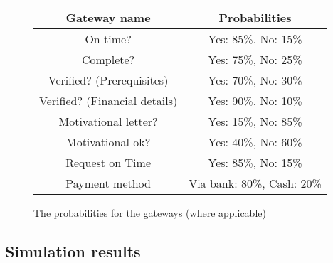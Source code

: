 \begin{figure}[h!]
	\centering
	\begin{tabular}{ | c | c | }
		\hline
		\textbf{Gateway name} & \textbf{Probabilities} \\ \hline\hline
		On time? & Yes: 85\%, No: 15\% \\ \hline
		Complete? & Yes: 75\%, No: 25\% \\ \hline
		Verified? (Prerequisites) & Yes: 70\%, No: 30\% \\ \hline
		Verified? (Financial details) & Yes: 90\%, No: 10\% \\ \hline
		Motivational letter? & Yes: 15\%, No: 85\% \\ \hline
		Motivational ok? & Yes: 40\%, No: 60\% \\ \hline
		Request on Time & Yes: 85\%, No: 15\% \\ \hline	
		Payment method & Via bank: 80\%, Cash: 20\% \\ \hline			
		\hline
	\end{tabular}
	\caption{The probabilities for the gateways (where applicable)}
	\label{fig:tasktimes1}
\end{figure}


\subsection{Simulation results}
